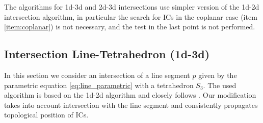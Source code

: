 \documentclass{elsarticle}
\newcommand{\noteJB}[1]{{\color{Blue} \textbf{JB: } \textit{#1}}}
\newcommand{\notePE}[1]{{\color{Orange} \textbf{PE: } \textit{#1}}}
\begin{document}
The algorithms for 1d-3d and 2d-3d intersections use simpler version of the 1d-2d intersection algorithm, in particular the search for ICs in the coplanar case 
(item \ref{item:coplanar}) is not necessary, and the test in the last point is not performed.


\subsection{Intersection Line-Tetrahedron (1d-3d)}
In this section we consider an intersection of a line segment $p$ given by the parametric equation \eqref{eq:line_parametric} with a tetrahedron 
$S_3$. The used algorithm is based on the 1d-2d algorithm and closely follows \cite{platis_fast_2003}. Our modification takes into account
intersection with the line segment and consistently propagates topological position of ICs.
\end{document}
